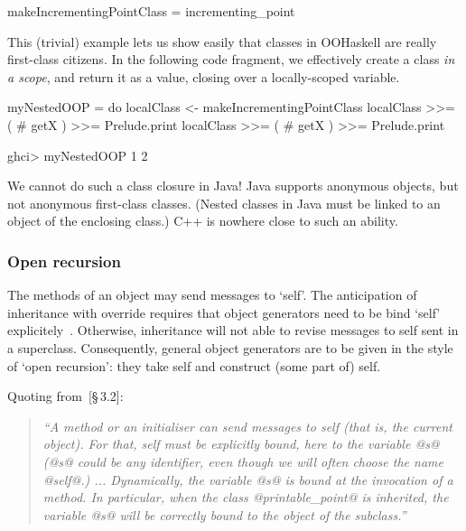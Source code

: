 \documentclass{jfp}
\begin{document}
\begin{code}
 makeIncrementingPointClass = incrementing_point
\end{code}

This (trivial) example lets us show easily that classes in OOHaskell
are really first-class citizens. In the following code fragment, we
effectively create a class \emph{in a scope}, and return it as a value,
closing over a locally-scoped variable. 

\begin{code}
 myNestedOOP =
   do
      localClass <- makeIncrementingPointClass
      localClass >>= ( # getX ) >>= Prelude.print
      localClass >>= ( # getX ) >>= Prelude.print
\end{code}

\begin{code}
 ghci> myNestedOOP
 1
 2
\end{code}

We cannot do such a class closure in Java! Java supports anonymous
objects, but not anonymous first-class classes. (Nested classes in
Java must be linked to an object of the enclosing class.) C++ is
nowhere close to such an ability.






\subsubsection{Open recursion}
\label{sec:open-recursion}

The methods of an object may send messages to `self'. The anticipation
of inheritance with override requires that object generators need to
be bind `self' explicitely~\cite{CookThesis}. Otherwise, inheritance
will not able to revise messages to self sent in a
superclass. Consequently, general object generators are to be given in
the style of `open recursion': they take self and construct (some part
of) self.

Quoting from~\cite{OCaml}[\S\,3.2]:

\begin{quote}\itshape\small
``A method or an initialiser can send messages to self (that is, the
current object). For that, self must be explicitly bound, here to the
variable @s@ (@s@ could be any identifier, even though we will often
choose the name @self@.) ... Dynamically, the variable @s@ is bound at
the invocation of a method. In particular, when the class
@printable_point@ is inherited, the variable @s@ will be correctly
bound to the object of the subclass.''
\end{quote}
\end{document}
